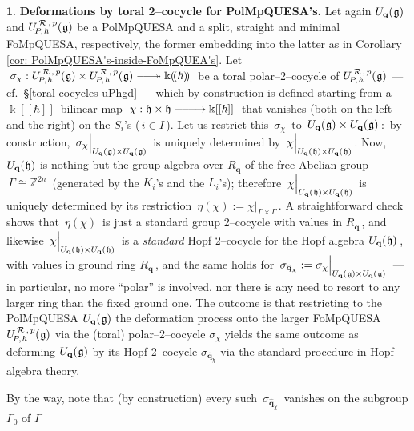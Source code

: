 \documentclass[12pt,reqno,twoside,a4paper]{amsart}
\numberwithin{equation}{section}
\theoremstyle{definition}
\newtheorem{free text}[lema]{}
\theoremstyle{remark}
\newcommand{\R}{{\mathcal R}}
\def \bq {\mathbf{q}}
\def \ZZ {\mathbb{Z}}
\def \kh{{\Bbbk[[\hbar]]}}
\def \khp{{\Bbbk(\hskip-1,7pt(\hbar)\hskip-1,7pt)}}
\def \lieg{\mathfrak{g}}
\def \lieh{\mathfrak{h}}
\def \uRpPhg{U^{\,\R\,,\,p}_{\!P,\hskip0,7pt\hbar}(\hskip0,5pt\lieg)}
\def \Ubqg {U_{\bq}(\hskip0,5pt\lieg)}
\def \Ubqh {U_{\bq}(\hskip0,5pt\lieh)}
\theoremstyle{plain}
\begin{document}
\begin{free text}  \label{2-cocycle-deform x PolMpQUESA's}
%
 \textbf{Deformations by toral 2--cocycle for PolMpQUESA's.}
 Let again  $ \Ubqg $  and  $ \uRpPhg $  be a PolMpQUE\-SA and a split,
 straight and minimal FoMpQUESA, respectively, the former embedding into
 the latter as in  Corollary \ref{cor: PolMpQUESA's-inside-FoMpQUEA's}.
%
 \vskip5pt
%
   Let  $ \; \sigma_\chi : \uRpPhg \times \uRpPhg
   \relbar\joinrel\relbar\joinrel\twoheadrightarrow \khp \; $
   be a toral polar--2--cocycle of  $ \uRpPhg $   --- cf.\ \S \ref{toral-cocycles-uPhgd}  ---
   which by construction is defined starting from a  $ \kh $--bilinear  map
   $ \; \chi : \lieh \times \lieh \relbar\joinrel\relbar\joinrel\longrightarrow \kh \; $
   that vanishes (both on the left and the right) on the  $ S_i $'s  ($ \, i \in I \, $).
   Let us restrict this  $ \, \sigma_\chi \, $  to
   $ \, \Ubqg \times \Ubqg \, $:  \,by construction,
   $ \, \sigma_\chi{\Big|}_{\Ubqg \times \Ubqg} \, $  is uniquely determined by
   $ \, \chi{\Big|}_{\Ubqh \times \Ubqh} \, $.  Now,  $ \Ubqh $
   is nothing but the group algebra over  $ R_\bq $  of the free Abelian group
   $ \, \varGamma \cong \ZZ^{2n} \, $  (generated by the  $ K_i $'s  and the $ L_i $'s);
   therefore  $ \, \chi{\Big|}_{\Ubqh \times \Ubqh} \, $  is uniquely
   determined by its restriction  $ \, \eta(\chi) := \chi{\Big|}_{\varGamma \times \varGamma} \, $.
   A straightforward check shows that  $ \, \eta(\chi) \, $
   is just a standard group 2--cocycle with values in  $ R_\bq \, $,  and likewise
   $ \, \chi{\Big|}_{\Ubqh \times \Ubqh} \, $  is a  \textsl{standard\/}
   Hopf 2--cocycle for the Hopf algebra  $ \Ubqh \, $,
   with values in ground ring  $ R_\bq \, $,  and the same holds for
   $ \, \sigma_{\hat{\bq}_\chi} := \sigma_\chi{\Big|}_{\Ubqg \times \Ubqg} \, $
   --- in particular, no more ``polar'' is involved, nor there is any need to
   resort to any larger ring than the fixed ground one.  The outcome is that
   restricting to the PolMpQUESA   $ \Ubqg $  the deformation process onto the larger FoMpQUESA
   $ \uRpPhg $  via the (toral) polar--2--cocycle  $ \sigma_\chi $  yields
   the same outcome as deforming  $ \Ubqg $  by its Hopf 2--cocycle
   $ \sigma_{\hat{\bq}_\chi} $  via the standard procedure in Hopf algebra theory.
                                                                  \par
   By the way, note that (by construction) every such  $ \, \sigma_{\hat{\bq}_\chi} \, $
   vanishes on the subgroup  $ \varGamma_0 $  of  $ \varGamma $

\end{free text}
\end{document}
